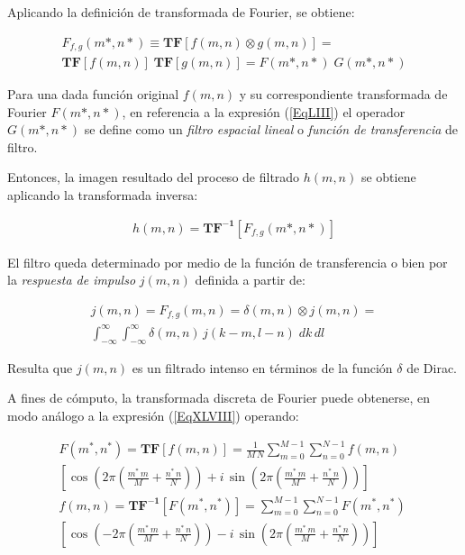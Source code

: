 Aplicando la definici\'on de transformada de Fourier, se obtiene:

\begin{eqnarray}
	F_{f, g}(m*, n*) \equiv \mathbf{TF} [ f(m, n) \otimes g(m, n) ] =  \nonumber \\
	\mathbf{TF} [ f(m, n)] \; \mathbf{TF} [ g(m, n)] = F(m*, n*) \; G(m*, n*)
\label{EqLIII}
\end{eqnarray}

Para una dada funci\'on original $f(m, n)$ y su correspondiente transformada de Fourier $F(m*, n*)$, en referencia a la expresi\'on (\ref{EqLIII})
el operador $G(m*, n*)$ se define como un \textit{filtro espacial lineal} o \textit{funci\'on de transferencia} de filtro.
%

%
Entonces, la imagen resultado del proceso de filtrado $h(m, n)$ se obtiene aplicando la transformada inversa:

\begin{eqnarray}
	h(m, n) = \mathbf{TF^{-1}} [F_{f, g}(m*, n*) ]
\label{EqLIV}
\end{eqnarray}

El filtro queda determinado por medio de la funci\'on de transferencia o bien por la \textit{respuesta de impulso} $j(m, n)$ definida a partir de:

\begin{eqnarray}
	j(m, n) = F_{f, g}(m, n) = \delta (m, n) \otimes j(m, n) =  \nonumber \\
	\int_{-\infty}^{\infty} \int_{-\infty}^{\infty} \delta(m, n) \, j(k-m, l-n) \; dk \, dl
\label{EqLV}
\end{eqnarray}

Resulta que $j(m, n)$ es un filtrado intenso en t\'erminos de la funci\'on $\delta$ de Dirac.
%

%
A fines de c\'omputo, la transformada discreta de Fourier puede obtenerse, en modo an\'alogo a la expresi\'on (\ref{EqXLVIII}) operando:

\begin{eqnarray}
	F(m^*, n^*) = \mathbf{TF}[f(m, n)] = \frac{1}{M \, N} \sum_{m=0}^{M-1} \sum_{n=0}^{N-1} f(m, n) \; \nonumber \\
	\left[ \cos \left( 2 \pi  (\frac{m^* \, m}{M} + \frac{n^* \, n}{N}) \right) +
	i \, \sin \left( 2 \pi  (\frac{m^* \, m}{M} + \frac{n^* \, n}{N}) \right)\right] \nonumber \\
	f(m, n) = \mathbf{TF^{-1}} [F(m^*, n^*)] = \sum_{m=0}^{M-1} \sum_{n=0}^{N-1} F(m^*, n^*) \; \nonumber \\
	\left[ \cos \left( -2 \pi  (\frac{m^* \, m}{M} + \frac{n^* \, n}{N}) \right) -
	i \, \sin \left( 2 \pi  (\frac{m^* \, m}{M} + \frac{n^* \, n}{N}) \right)\right] \nonumber \\
\label{EqLVI}
\end{eqnarray}

